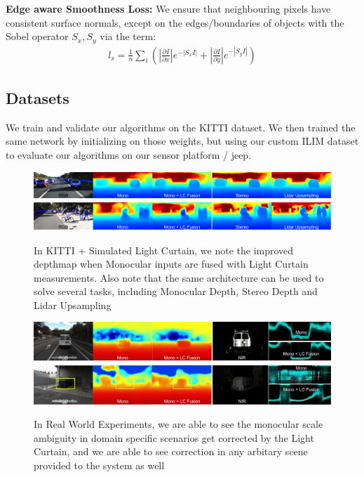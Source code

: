 \textbf{Edge aware Smoothness Loss:} We ensure that neighbouring pixels have consistent surface normals, except on the edges/boundaries of objects with the Sobel operator $S_{x}, S_{y}$ via the term:
\small
\begin{align}
    l_{s}=\frac{1}{n}\sum_{i}\left(\left|\frac{\partial I}{\partial x}\right|e^{-|S_{x}I|}+\left|\frac{\partial I}{\partial y}\right|e^{-|S_{y}I|}\right)
   \label{eq:smooth} 
\end{align}
\normalsize

\subsection{Datasets}

We train and validate our algorithms on the KITTI dataset. We then trained the same network by initializing on those weights, but using our custom ILIM dataset to evaluate our algorithms on our sensor platform / jeep.

\begin{figure}[h!]
   \includegraphics[width=1.0\textwidth]{figures/p1.png}
   \includegraphics[width=1.0\textwidth]{figures/p2.png}
   \caption{In KITTI + Simulated Light Curtain, we note the improved depthmap when Monocular inputs are fused with Light Curtain measurements. Also note that the same architecture can be used to solve several tasks, including Monocular Depth, Stereo Depth and Lidar Upsampling}  
   \label{fig:images2} 
\end{figure}

\begin{figure}[h!]
   \includegraphics[width=1.0\textwidth]{figures/p4.png}
   \includegraphics[width=1.0\textwidth]{figures/p5.png}
   \caption{In Real World Experiments, we are able to see the monocular scale ambiguity in domain specific scenarios get corrected by the Light Curtain, and we are able to see correction in any arbitary scene provided to the system as well}  
   \label{fig:images3} 
\end{figure}

